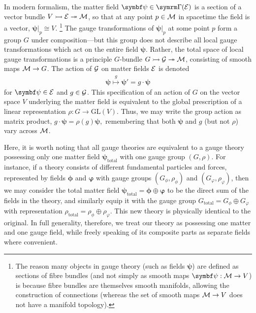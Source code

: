 In modern formalism, the matter field $\bm\psi \in \secs(\cal E)$ is a section of a vector bundle $\fibrebundle{V}{\cal E}{\cal M}$, so that at any point $p \in \cal M$ in spacetime the field is a vector, $\bm\psi|_p \cong V$.%
\footnote{
	The reason many objects in gauge theory (such as fields $\bm\psi$) are defined as sections of fibre bundles (and not simply as smooth maps $\bm\psi : \cal M \to V$) is because fibre bundles are themselves smooth manifolds, allowing the construction of connections (whereas the set of smooth maps $\cal M \to V$ does not have a manifold topology).
}
The gauge transformations of $\bm\psi|_p$ at some point $p$ form a group $G$ under composition---but this group does not describe all local gauge transformations which act on the entire field $\bm\psi$.
Rather, the total space of local gauge transformations is a principle $G$-bundle $\fibrebundle{G}{\cal G}{\cal M}$, consisting of smooth maps $\cal M \to G$.
The action of $\cal G$ on matter fields $\cal E$ is denoted
\begin{align}
	\bm\psi \overset{g}{\mapsto} \bm\psi' = g\cdot\bm\psi
\end{align}
for $\bm\psi \in \cal E$ and $g \in \cal G$.
This specification of an action of $G$ on the vector space $V$ underlying the matter field is equivalent to the global prescription of a linear representation $\rho : G \to \mathrm{GL}(V)$.
Thus, we may write the group action as matrix product,
\begin{math}
	g \cdot \bm\psi = \rho(g)\bm\psi
,\end{math}
remembering that both $\bm\psi$ and $g$ (but not $\rho$) vary across $\cal M$.

Here, it is worth noting that all gauge theories are equivalent to a gauge theory possessing only one matter field $\bm\psi_\text{total}$ with one gauge group $(G, \rho)$.
For instance, if a theory consists of different fundamental particles and forces, represented by fields $\bm\phi$ and $\bm\varphi$ with gauge groups $(G_\phi, \rho_\phi)$ and $(G_\varphi, \rho_\varphi)$,
then we may consider the total matter field $\bm\psi_\text{total} = \bm\phi \oplus \bm\varphi$ to be the direct sum of the fields in the theory, and similarly equip it with the gauge group $G_\text{total} = G_\phi \oplus G_\varphi$ with representation $\rho_\text{total} = \rho_\phi \oplus \rho_\varphi$.
This new theory is physically identical to the original.
In full generality, therefore, we treat our theory as possessing one matter and one gauge field, while freely speaking of its composite parts as separate fields where convenient.

